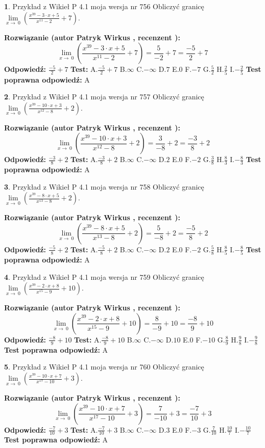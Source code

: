 \documentclass[12pt, a4paper]{article}
\theoremstyle{definition} %
\newtheorem{zad}{}
\newcommand{\zadStart}[1]{\begin{zad}#1\newline}
\newcommand{\zadStop}{\end{zad}}
\newcommand{\rozwStart}[2]{\noindent \textbf{Rozwiązanie (autor #1 , recenzent #2): }\newline}
\newcommand{\rozwStop}{\newline}
\newcommand{\odpStart}{\noindent \textbf{Odpowiedź:}\newline}
\newcommand{\odpStop}{\newline}
\newcommand{\testStart}{\noindent \textbf{Test:}\newline}
\newcommand{\testStop}{\newline}
\newcommand{\kluczStart}{\noindent \textbf{Test poprawna odpowiedź:}\newline}
\newcommand{\kluczStop}{\newline}
\begin{document}
\zadStart{Przykład z Wikieł P 4.1 moja wersja nr 756}
Obliczyć granicę $\lim\limits_{x\to\ 0}(\frac{x^{39}-3 \cdot x +5}{x^{11}-2}+7)$.
\zadStop
\rozwStart{Patryk Wirkus}{}
$$\lim\limits_{x\to\ 0}(\frac{x^{39}-3 \cdot x +5}{x^{11}-2}+7)=\frac{5}{-2}+7=\frac{-5}{2}+7$$
\rozwStop
\odpStart
$\frac{-5}{2}+7$
\odpStop
\testStart
A.$\frac{-5}{2}+7$
B.$\infty$
C.$-\infty$
D.$7$
E.$0$
F.$-7$
G.$\frac{5}{2}$
H.$\frac{2}{5}$
I.$-\frac{2}{5}$
\testStop
\kluczStart
A
\kluczStop



\zadStart{Przykład z Wikieł P 4.1 moja wersja nr 757}
Obliczyć granicę $\lim\limits_{x\to\ 0}(\frac{x^{39}-10 \cdot x +3}{x^{12}-8}+2)$.
\zadStop
\rozwStart{Patryk Wirkus}{}
$$\lim\limits_{x\to\ 0}(\frac{x^{39}-10 \cdot x +3}{x^{12}-8}+2)=\frac{3}{-8}+2=\frac{-3}{8}+2$$
\rozwStop
\odpStart
$\frac{-3}{8}+2$
\odpStop
\testStart
A.$\frac{-3}{8}+2$
B.$\infty$
C.$-\infty$
D.$2$
E.$0$
F.$-2$
G.$\frac{3}{8}$
H.$\frac{8}{3}$
I.$-\frac{8}{3}$
\testStop
\kluczStart
A
\kluczStop



\zadStart{Przykład z Wikieł P 4.1 moja wersja nr 758}
Obliczyć granicę $\lim\limits_{x\to\ 0}(\frac{x^{39}-8 \cdot x +5}{x^{13}-8}+2)$.
\zadStop
\rozwStart{Patryk Wirkus}{}
$$\lim\limits_{x\to\ 0}(\frac{x^{39}-8 \cdot x +5}{x^{13}-8}+2)=\frac{5}{-8}+2=\frac{-5}{8}+2$$
\rozwStop
\odpStart
$\frac{-5}{8}+2$
\odpStop
\testStart
A.$\frac{-5}{8}+2$
B.$\infty$
C.$-\infty$
D.$2$
E.$0$
F.$-2$
G.$\frac{5}{8}$
H.$\frac{8}{5}$
I.$-\frac{8}{5}$
\testStop
\kluczStart
A
\kluczStop



\zadStart{Przykład z Wikieł P 4.1 moja wersja nr 759}
Obliczyć granicę $\lim\limits_{x\to\ 0}(\frac{x^{39}-2 \cdot x +8}{x^{15}-9}+10)$.
\zadStop
\rozwStart{Patryk Wirkus}{}
$$\lim\limits_{x\to\ 0}(\frac{x^{39}-2 \cdot x +8}{x^{15}-9}+10)=\frac{8}{-9}+10=\frac{-8}{9}+10$$
\rozwStop
\odpStart
$\frac{-8}{9}+10$
\odpStop
\testStart
A.$\frac{-8}{9}+10$
B.$\infty$
C.$-\infty$
D.$10$
E.$0$
F.$-10$
G.$\frac{8}{9}$
H.$\frac{9}{8}$
I.$-\frac{9}{8}$
\testStop
\kluczStart
A
\kluczStop



\zadStart{Przykład z Wikieł P 4.1 moja wersja nr 760}
Obliczyć granicę $\lim\limits_{x\to\ 0}(\frac{x^{39}-10 \cdot x +7}{x^{17}-10}+3)$.
\zadStop
\rozwStart{Patryk Wirkus}{}
$$\lim\limits_{x\to\ 0}(\frac{x^{39}-10 \cdot x +7}{x^{17}-10}+3)=\frac{7}{-10}+3=\frac{-7}{10}+3$$
\rozwStop
\odpStart
$\frac{-7}{10}+3$
\odpStop
\testStart
A.$\frac{-7}{10}+3$
B.$\infty$
C.$-\infty$
D.$3$
E.$0$
F.$-3$
G.$\frac{7}{10}$
H.$\frac{10}{7}$
I.$-\frac{10}{7}$
\testStop
\kluczStart
A
\kluczStop
\end{document}
